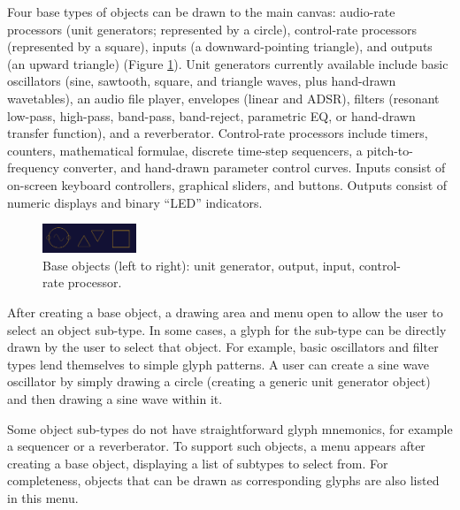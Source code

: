 \documentclass{nime-alternate}
\begin{document}
Four base types of objects can be drawn to the main canvas: audio-rate processors (unit generators; represented by a circle), control-rate processors (represented by a square), inputs (a downward-pointing triangle), and outputs (an upward triangle) (Figure \ref{fig:baseObjects}). 
Unit generators currently available include basic oscillators (sine, sawtooth, square, and triangle waves, plus hand-drawn wavetables), an audio file player, envelopes (linear and ADSR), filters (resonant low-pass, high-pass, band-pass, band-reject, parametric EQ, or hand-drawn transfer function), and a reverberator. 
Control-rate processors include timers, counters, mathematical formulae, discrete time-step sequencers, a pitch-to-frequency converter, and hand-drawn parameter control curves. 
Inputs consist of on-screen keyboard controllers, graphical sliders, and buttons. 
Outputs consist of numeric displays and binary ``LED'' indicators. 

\begin{figure}[h]
	\centering
		\includegraphics[width=0.25\textwidth]{figures/baseobjects.png}
	\caption{Base objects (left to right): unit generator, output, input, control-rate processor.}
	\label{fig:baseObjects}
\end{figure}

After creating a base object, a drawing area and menu open to allow the user to select an object sub-type. 
In some cases, a glyph for the sub-type can be directly drawn by the user to select that object. 
For example, basic oscillators and filter types lend themselves to simple glyph patterns. 
A user can create a sine wave oscillator by simply drawing a circle (creating a generic unit generator object) and then drawing a sine wave within it. 

Some object sub-types do not have straightforward glyph mnemonics, for example a sequencer or a reverberator. 
To support such objects, a menu appears after creating a base object, displaying a list of subtypes to select from. 
For completeness, objects that can be drawn as corresponding glyphs are also listed in this menu.

\end{document}
